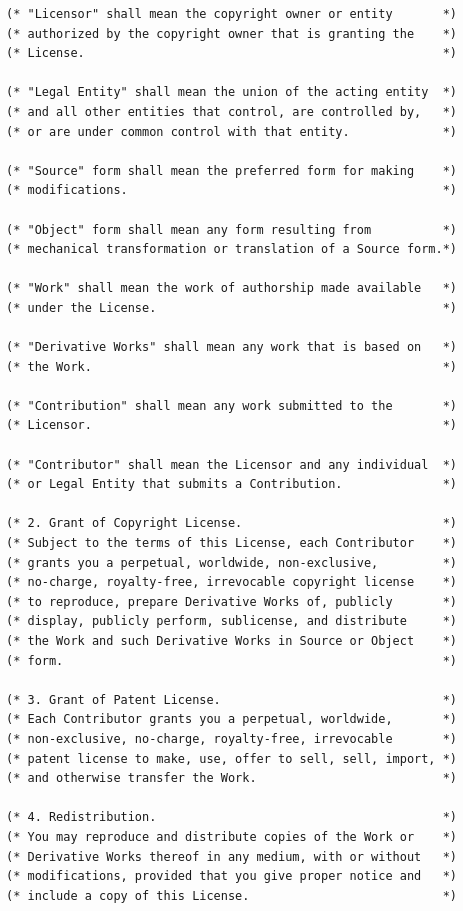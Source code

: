 \documentclass[12pt,a4paper]{article}
\begin{document}
\begin{verbatim}
(* "Licensor" shall mean the copyright owner or entity       *)
(* authorized by the copyright owner that is granting the    *)
(* License.                                                  *)

(* "Legal Entity" shall mean the union of the acting entity  *)
(* and all other entities that control, are controlled by,   *)
(* or are under common control with that entity.             *)

(* "Source" form shall mean the preferred form for making    *)
(* modifications.                                            *)

(* "Object" form shall mean any form resulting from          *)
(* mechanical transformation or translation of a Source form.*)

(* "Work" shall mean the work of authorship made available   *)
(* under the License.                                        *)

(* "Derivative Works" shall mean any work that is based on   *)
(* the Work.                                                 *)

(* "Contribution" shall mean any work submitted to the       *)
(* Licensor.                                                 *)

(* "Contributor" shall mean the Licensor and any individual  *)
(* or Legal Entity that submits a Contribution.              *)

(* 2. Grant of Copyright License.                            *)
(* Subject to the terms of this License, each Contributor    *)
(* grants you a perpetual, worldwide, non-exclusive,         *)
(* no-charge, royalty-free, irrevocable copyright license    *)
(* to reproduce, prepare Derivative Works of, publicly       *)
(* display, publicly perform, sublicense, and distribute     *)
(* the Work and such Derivative Works in Source or Object    *)
(* form.                                                     *)

(* 3. Grant of Patent License.                               *)
(* Each Contributor grants you a perpetual, worldwide,       *)
(* non-exclusive, no-charge, royalty-free, irrevocable       *)
(* patent license to make, use, offer to sell, sell, import, *)
(* and otherwise transfer the Work.                          *)

(* 4. Redistribution.                                        *)
(* You may reproduce and distribute copies of the Work or    *)
(* Derivative Works thereof in any medium, with or without   *)
(* modifications, provided that you give proper notice and   *)
(* include a copy of this License.                           *)


\end{verbatim}
\end{document}
